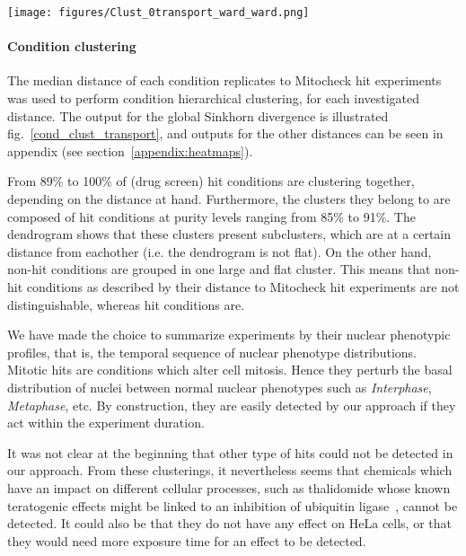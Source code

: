 \begin{figure*}[ht!]
\centerline{\texttt{[image: figures/Clust\_0transport\_ward\_ward.png]}}

\caption{Drug screen condition - Mitocheck siRNA two-dimensional hierarchical clustering using global Sinkhorn divergence. Ward method was used in combination with the Euclidean distance.}
\label{cond_clust_transport}
\end{figure*}

\paragraph{Condition clustering}
The median distance of each condition replicates to Mitocheck hit experiments was used to perform condition hierarchical clustering, for each investigated distance. The output for the global Sinkhorn divergence is illustrated fig.~\ref{cond_clust_transport}, and outputs for the other distances can be seen in appendix (see section~\ref{appendix:heatmaps}).

From 89\% to 100\% of (drug screen) hit conditions are clustering together, depending on the distance at hand. Furthermore, the clusters they belong to are composed of hit conditions at purity levels ranging from 85\% to 91\%. The dendrogram shows that these clusters present subclusters, which are at a certain distance from eachother (i.e. the dendrogram is not flat). On the other hand, non-hit conditions are grouped in one large and flat cluster. This means that non-hit conditions as described by their distance to Mitocheck hit experiments are not distinguishable, whereas hit conditions are.

We have made the choice to summarize experiments by their nuclear phenotypic profiles, that is, the temporal sequence of nuclear phenotype distributions. Mitotic hits are conditions which alter cell mitosis. Hence they perturb the basal distribution of nuclei between normal nuclear phenotypes such as \textit{Interphase}, \textit{Metaphase}, etc. By construction, they are easily detected by our approach if they act within the experiment duration. 

It was not clear at the beginning that other type of hits could not be detected in our approach. From these clusterings, it nevertheless seems that chemicals which have an impact on different cellular processes, such as thalidomide whose known teratogenic effects might be linked to an inhibition of ubiquitin ligase~\cite{pmid20223979}, cannot be detected. It could also be that they do not have any effect on HeLa cells, or that they would need more exposure time for an effect to be detected.

